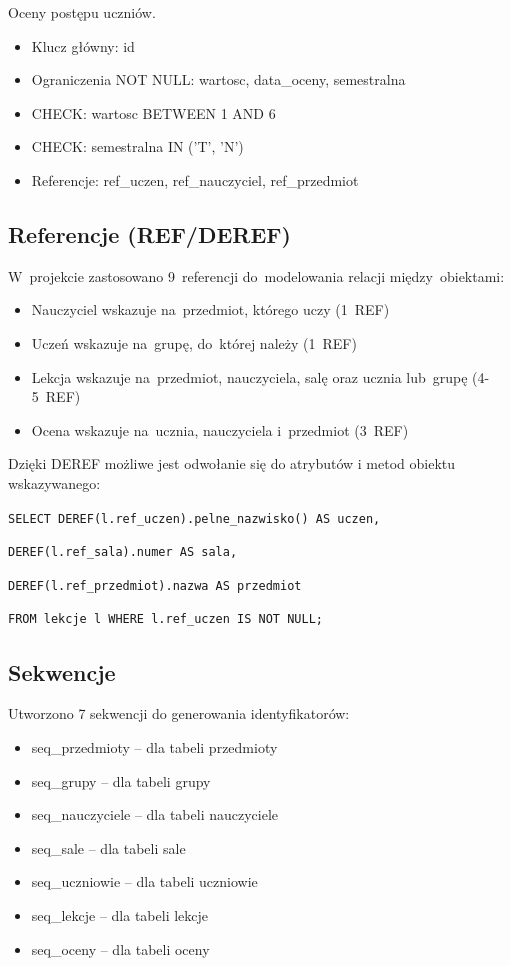 \documentclass[12pt,a4paper]{article}
\begin{document}
Oceny postępu uczniów.

\begin{itemize}[nosep]
    \item Klucz główny: id
    \item Ograniczenia NOT NULL: wartosc, data\_oceny, semestralna
    \item CHECK: wartosc BETWEEN 1 AND 6
    \item CHECK: semestralna IN ('T', 'N')
    \item Referencje: ref\_uczen, ref\_nauczyciel, ref\_przedmiot
\end{itemize}

\subsection{Referencje (REF/DEREF)}

W~projekcie zastosowano 9~referencji do~modelowania relacji między~obiektami:

\begin{itemize}[nosep]
    \item Nauczyciel wskazuje na~przedmiot, którego uczy (1~REF)
    \item Uczeń wskazuje na~grupę, do~której należy (1~REF)
    \item Lekcja wskazuje na~przedmiot, nauczyciela, salę oraz ucznia lub~grupę (4-5~REF)
    \item Ocena wskazuje na~ucznia, nauczyciela i~przedmiot (3~REF)
\end{itemize}

Dzięki DEREF możliwe jest odwołanie się do atrybutów i metod obiektu wskazywanego:

\texttt{SELECT DEREF(l.ref\_uczen).pelne\_nazwisko() AS uczen,}

\texttt{\hspace{1.5cm}DEREF(l.ref\_sala).numer AS sala,}

\texttt{\hspace{1.5cm}DEREF(l.ref\_przedmiot).nazwa AS przedmiot}

\texttt{FROM lekcje l WHERE l.ref\_uczen IS NOT NULL;}

\subsection{Sekwencje}

Utworzono 7 sekwencji do generowania identyfikatorów:

\begin{itemize}[nosep]
    \item seq\_przedmioty -- dla tabeli przedmioty
    \item seq\_grupy -- dla tabeli grupy
    \item seq\_nauczyciele -- dla tabeli nauczyciele
    \item seq\_sale -- dla tabeli sale
    \item seq\_uczniowie -- dla tabeli uczniowie
    \item seq\_lekcje -- dla tabeli lekcje
    \item seq\_oceny -- dla tabeli oceny
\end{itemize}
\end{document}
